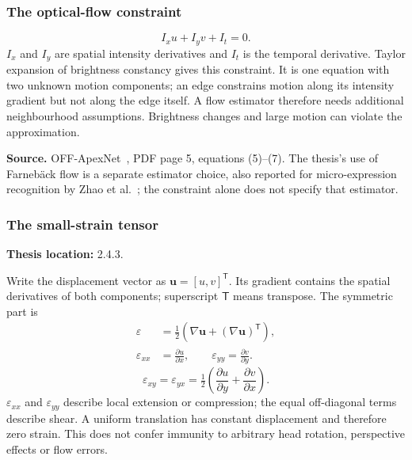 \documentclass[11pt,a4paper]{article}
\numberwithin{equation}{section}
\begin{document}
\subsubsection{The optical-flow constraint}
\begin{equation}
    I_xu+I_yv+I_t=0.
    \label{fg:eq:flow-constraint}
\end{equation}
$I_x$ and $I_y$ are spatial intensity derivatives and $I_t$ is the temporal
derivative. Taylor expansion of brightness constancy gives this constraint.
It is one equation with two unknown motion components; an edge constrains
motion along its intensity gradient but not along the edge itself. A flow
estimator therefore needs additional neighbourhood assumptions. Brightness
changes and large motion can violate the approximation.

\textbf{Source.} OFF-ApexNet~\cite{liong2019a}, PDF page 5,
equations (5)--(7). The thesis's use of Farneb\"ack flow is a separate estimator
choice, also reported for micro-expression recognition by Zhao
et al.~\cite{zhaoS2021}; the constraint alone does not specify that estimator.

\subsubsection{The small-strain tensor}
\label{fg:strain}
\textbf{Thesis location:} 2.4.3.

Write the displacement vector as $\mathbf{u}=[u,v]^{\mathsf T}$. Its gradient
contains the spatial derivatives of both components; superscript $\mathsf T$
means transpose. The symmetric part is
\begin{equation}
\begin{aligned}
    \varepsilon&=\tfrac12\left(\nabla\mathbf{u}
                         +(\nabla\mathbf{u})^{\mathsf T}\right),\\
    \varepsilon_{xx}&=\frac{\partial u}{\partial x},\qquad
    \varepsilon_{yy}=\frac{\partial v}{\partial y}.
\end{aligned}
    \label{fg:eq:strain-normal}
\end{equation}
\begin{equation}
    \varepsilon_{xy}=\varepsilon_{yx}
       =\tfrac12\left(\frac{\partial u}{\partial y}
                    +\frac{\partial v}{\partial x}\right).
    \label{fg:eq:strain-shear}
\end{equation}
$\varepsilon_{xx}$ and $\varepsilon_{yy}$ describe local extension or
compression; the equal off-diagonal terms describe shear. A uniform translation
has constant displacement and therefore zero strain. This does not confer
immunity to arbitrary head rotation, perspective effects or flow errors.
\end{document}
